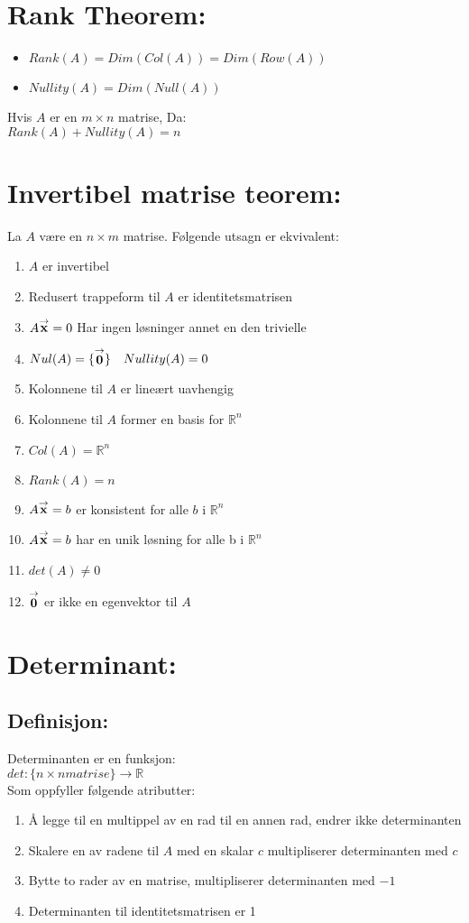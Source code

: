 \documentclass[12pt,a4paper,twocolumn,twoside]{article}
\def\real{\mathbb{R}}
\def\vector#1{\bold{\stackrel{\rightarrow}{#1}}}
\begin{document}
\section*{Rank Theorem:}
\begin{itemize}[topsep=0pt,itemsep=0pt, partopsep=0pt]
    \item $Rank(A) = Dim(Col(A)) = Dim(Row(A))$
    \item $Nullity(A) = Dim(Null(A))$
\end{itemize}
Hvis $A$ er en $m \times n$ matrise, Da:\\ $Rank(A)+Nullity(A)=n$
\section*{Invertibel matrise teorem:}
La $A$ være en $n\times m$ matrise. Følgende utsagn er ekvivalent:
\begin{enumerate}[topsep=0pt,itemsep=0pt, partopsep=0pt]
    \item $A$ er invertibel
    \item Redusert trappeform til $A$ er identitetsmatrisen
    \item $A\vector{x}=0$ Har ingen løsninger annet en den trivielle
    \item $Nul(A) = \{\vector{0}\}\quad Nullity(A) = 0$
    \item Kolonnene til $A$ er lineært uavhengig
    \item Kolonnene til $A$ former en basis for $\real^n$
    \item $Col(A) = \real^n$
    \item $Rank(A)=n$
    \item $A\vector{x}=b$ er konsistent for alle $b$ i $\real^n$
    \item $A\vector{x}=b$ har en unik løsning for alle b i $\real^n$
    \item $det(A)\neq 0$
    \item $\vector{0}$ er ikke en egenvektor til $A$
\end{enumerate}
\section*{Determinant:}
\subsection*{Definisjon:}
Determinanten er en funksjon:\\
$det:\{n\times n matrise\}\rightarrow \real$\\
Som oppfyller følgende atributter:
\begin{enumerate}[topsep=0pt,itemsep=0pt, partopsep=0pt]
    \item Å legge til en multippel av en rad til en annen rad, endrer ikke determinanten
    \item Skalere en av radene til $A$ med en skalar $c$ multipliserer determinanten med $c$
    \item Bytte to rader av en matrise, multipliserer determinanten med $-1$
    \item Determinanten til identitetsmatrisen er 1
\end{enumerate}
\end{document}
